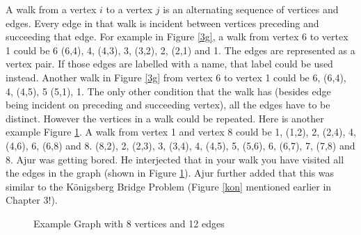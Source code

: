 A walk from a vertex $i$ to a vertex $j$ is an alternating sequence of vertices and edges. Every edge in that walk is incident between vertices preceding and succeeding that edge. For example in Figure \ref{3g},
a walk from vertex 6 to vertex 1 could be 6 (6,4), 4, (4,3), 3, (3,2), 2, (2,1) and 1. The edges are represented as a vertex pair. If those edges are labelled with a name, that label could be used instead. Another walk in Figure \ref{3g} from vertex 6 to vertex 1 could be 6, (6,4), 4, (4,5), 5 (5,1), 1.  The only other condition that the walk has (besides edge being incident on preceding and succeeding vertex), all the edges have to be distinct. However the vertices in a walk could be repeated. 
Here is another example Figure \ref{3g3}. A walk from vertex 1 and vertex 8 could be 1, (1,2), 2, (2,4), 4, (4,6), 6, (6,8) and 8. (8,2), 2, (2,3), 3, (3,4), 4, (4,5), 5, (5,6), 6, (6,7), 7, (7,8) and 8. Ajur was getting bored. He interjected that in your walk you have visited all the edges in the graph (shown in Figure \ref{3g3}). Ajur further added that this was similar to the K\"{o}nigsberg Bridge Problem (Figure \ref{kon} mentioned earlier in Chapter 3!).  
\begin{figure}
\begin{center}
\caption{ Example Graph with 8 vertices and 12 edges}\label{3g3}
\end{center}
\end{figure}
\\

